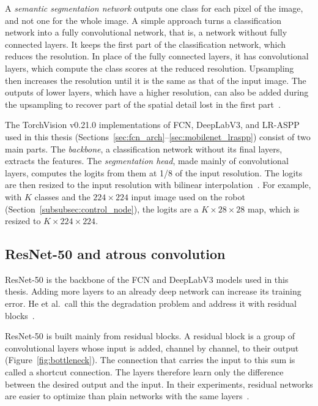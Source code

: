 A \textit{semantic segmentation network} outputs one class for each pixel of the image, and not one for the whole image. A simple approach turns a classification network into a fully convolutional network, that is, a network without fully connected layers. It keeps the first part of the classification network, which reduces the resolution. In place of the fully connected layers, it has convolutional layers, which compute the class scores at the reduced resolution. Upsampling then increases the resolution until it is the same as that of the input image. The outputs of lower layers, which have a higher resolution, can also be added during the upsampling to recover part of the spatial detail lost in the first part~\cite{geron2026handson}.

The TorchVision v0.21.0 implementations of FCN, DeepLabV3, and LR-ASPP used in this thesis (Sections~\ref{sec:fcn_arch}--\ref{sec:mobilenet_lraspp}) consist of two main parts. The \textit{backbone}, a classification network without its final layers, extracts the features. The \textit{segmentation head}, made mainly of convolutional layers, computes the logits from them at 1/8 of the input resolution. The logits are then resized to the input resolution with bilinear interpolation~\cite{torchvision_fcn,torchvision_deeplabv3,torchvision_lraspp,torchvision_seg_utils}. For example, with $K$ classes and the $224\times224$ input image used on the robot (Section~\ref{subsubsec:control_node}), the logits are a $K\times28\times28$ map, which is resized to $K\times224\times224$.

\subsection{ResNet-50 and atrous convolution}
\label{subsec:resnet_atrous}

ResNet-50 is the backbone of the FCN and DeepLabV3 models used in this thesis. Adding more layers to an already deep network can increase its training error. He et al.\ call this the degradation problem and address it with residual blocks~\cite{he2016deep}.

ResNet-50 is built mainly from residual blocks. A residual block is a group of convolutional layers whose input is added, channel by channel, to their output (Figure~\ref{fig:bottleneck}). The connection that carries the input to this sum is called a shortcut connection. The layers therefore learn only the difference between the desired output and the input. In their experiments, residual networks are easier to optimize than plain networks with the same layers~\cite{he2016deep}.

